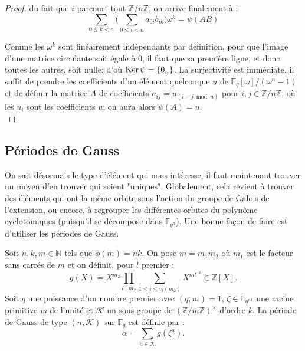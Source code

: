 \documentclass[a4paper]{article} %
\numberwithin{section}{part}
\numberwithin{equation}{section}
\newcommand\nroot[1]{\textit{#1}\up{\textit{ième}}}
\newcommand\zmodn[1]{\mathbb{Z}/#1\mathbb{Z}}
\newcommand\zmodninv[1]{(\mathbb{Z}/#1\mathbb{Z})^{\times}}
\newcommand\GF[1]{\mathbb{F}_{#1}}
\newcommand\ZZ{\mathbb{Z}}
\newcommand\NN{\mathbb{N}}
\begin{document}
\begin{proof}
du fait que $i$ parcourt tout $\zmodn{n}$, on arrive finalement à :
\[\sum_{0\leq k < n}{\bigg(\sum_{0\leq i < n}{a_{0i}b_{ik}}\bigg)\omega^k} = 
\psi(AB)\]\par
Comme les $\omega^k$ sont linéairement indépendants par définition, pour que 
l'image d'une matrice circulante soit égale à $0$, il faut que sa première 
ligne, et donc toutes les autres, soit nulle; d'où $\textup{Ker}\,\psi = 
\{0_n\}$. La surjectivité est immédiate, il suffit de prendre les coefficients 
d'un élément quelconque $u$ de $\GF{q}[\omega]/(\omega^n - 1)$ et de définir la 
matrice $A$ de coefficients $a_{ij} = u_{(i-j \bmod n)}$ pour $i,j\in\zmodn{n}$,
où les $u_i$ sont les coefficients $u$; on aura alors $\psi(A) = u$.\\
\end{proof}




\subsection{Périodes de Gauss}
\label{sec:pergauss}
On sait désormais le type d'élément qui nous intéresse, il faut maintenant 
trouver un moyen d'en trouver qui soient "uniques". Globalement, cela revient à
trouver des éléments qui ont la même orbite sous l'action du groupe de Galois de
l'extension, ou encore, à regrouper les différentes orbites du polynôme
cyclotomiques (puisqu'il se décompose dans $\GF{q^n}$). Une bonne façon de faire
est d'utiliser les périodes de Gauss.

\begin{defn}
Soit $n, k, m\in\NN$ tels que $\phi(m) = nk$. On pose $m = m_1m_2$ où $m_1$ est
le facteur sans carrés de $m$ et on définit, pour $l$ premier :
\[g(X) = X^{m_2}\prod_{l\mid m_2}{\sum_{1\leq i\leq
v_l(m_2)}{X^{ml^{-i}}}}\in\ZZ[X].\]
Soit $q$ une puissance d'un nombre premier avec $(q, m) = 1$,
$\zeta\in\GF{q^{nk}}$ une racine primitive \nroot{m} de l'unité et $\mathcal{K}$
un sous-groupe de $\zmodninv{m}$ d'ordre $k$. La période de Gauss de type $(n,
\mathcal{K})$ sur $\GF{q}$ est définie par :
\begin{equation}
\label{eq:gausgen}
\alpha = \sum_{a\in\mathcal{K}}{g(\zeta^a)}.
\end{equation}
\end{defn}
\end{document}
